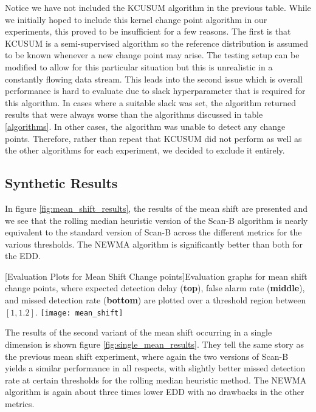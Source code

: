 Notice we have not included the KCUSUM algorithm in the previous table. While we initially hoped to include this kernel change point algorithm in our experiments, this proved to be insufficient for a few reasons. The first is that KCUSUM is a semi-supervised algorithm so the reference distribution is assumed to be known whenever a new change point may arise. The testing setup can be modified to allow for this particular situation but this is unrealistic in a constantly flowing data stream. This leads into the second issue which is overall performance is hard to evaluate due to slack hyperparameter that is required for this algorithm. In cases where a suitable slack was set, the algorithm returned results that were always worse than the algorithms discussed in table \ref{algorithms}. In other cases, the algorithm was unable to detect any change points. Therefore, rather than repeat that KCUSUM did not perform as well as the other algorithms for each experiment, we decided to exclude it entirely. 

\subsection{Synthetic Results}
In figure \ref{fig:mean_shift_results}, the results of the mean shift are presented and we see that the rolling median heuristic version of the Scan-B algorithm is nearly equivalent to the standard version of Scan-B across the different metrics for the various thresholds. The NEWMA algorithm is significantly better than both for the EDD.

\begin{minipage}{\textwidth}
\begin{center} 
[Evaluation Plots for Mean Shift Change points]{Evaluation graphs for mean shift change points, where expected detection delay (\textbf{top}), false alarm rate (\textbf{middle}), and missed detection rate (\textbf{bottom}) are plotted over a threshold region between $[1,1.2]$. } 
\texttt{[image: mean\_shift]} 
\label{fig:mean_shift_results} 
\end{center}
\end{minipage}

The results of the second variant of the mean shift occurring in a single dimension is shown figure \ref{fig:single_mean_results}. They tell the same story as the previous mean shift experiment, where again the two versions of Scan-B yields a similar performance in all respects, with slightly better missed detection rate at certain thresholds for the rolling median heuristic method. The NEWMA algorithm is again about three times lower EDD with no drawbacks in the other metrics.

